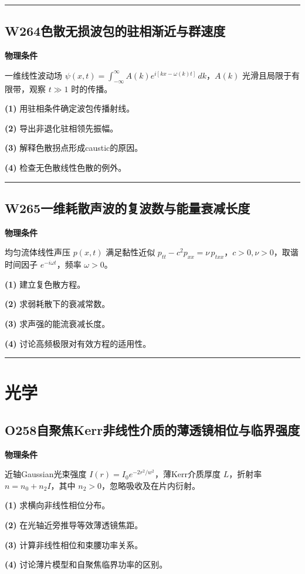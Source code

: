 \documentclass[UTF8,a4paper,11pt,oneside,openany]{ctexbook}
\begin{document}
\par\bigskip\hrule\bigskip
\section*{W264\quad 色散无损波包的驻相渐近与群速度}
\textbf{物理条件}\par 一维线性波动场 \(\psi(x,t)=\int_{-\infty}^\infty A(k)e^{i[kx-\omega(k)t]}\,dk\)，\(A(k)\) 光滑且局限于有限带，观察 \(t\gg1\) 时的传播。
\par\noindent\textbf{(1)} 用驻相条件确定波包传播射线。
\par\noindent\textbf{(2)} 导出非退化驻相领先振幅。
\par\noindent\textbf{(3)} 解释色散拐点形成caustic的原因。
\par\noindent\textbf{(4)} 检查无色散线性色散的例外。

\par\bigskip\hrule\bigskip
\section*{W265\quad 一维耗散声波的复波数与能量衰减长度}
\textbf{物理条件}\par 均匀流体线性声压 \(p(x,t)\) 满足黏性近似 \(p_{tt}-c^2p_{xx}=\nu\,p_{txx}\)，\(c>0,\nu>0\)，取谐时间因子 \(e^{-i\omega t}\)，频率 \(\omega>0\)。
\par\noindent\textbf{(1)} 建立复色散方程。
\par\noindent\textbf{(2)} 求弱耗散下的衰减常数。
\par\noindent\textbf{(3)} 求声强的能流衰减长度。
\par\noindent\textbf{(4)} 讨论高频极限对有效方程的适用性。

\par\bigskip\hrule\bigskip
\chapter{光学}
\section*{O258\quad 自聚焦Kerr非线性介质的薄透镜相位与临界强度}
\textbf{物理条件}\par 近轴Gaussian光束强度 \(I(r)=I_0e^{-2r^2/w^2}\)，薄Kerr介质厚度 \(L\)，折射率 \(n=n_0+n_2I\)，其中 \(n_2>0\)，忽略吸收及在片内衍射。
\par\noindent\textbf{(1)} 求横向非线性相位分布。
\par\noindent\textbf{(2)} 在光轴近旁推导等效薄透镜焦距。
\par\noindent\textbf{(3)} 计算非线性相位和束腰功率关系。
\par\noindent\textbf{(4)} 讨论薄片模型和自聚焦临界功率的区别。
\end{document}

